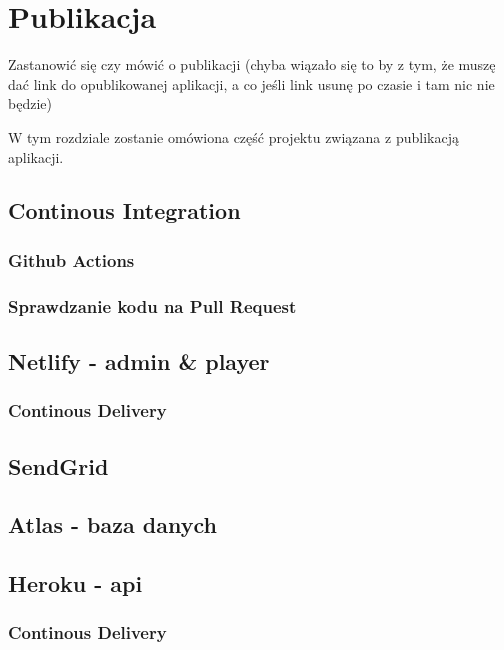 \chapter{Publikacja}
\label{ch:funplenop}

Zastanowić się czy mówić o publikacji (chyba wiązało się to by z tym, że muszę dać link do opublikowanej aplikacji, a co jeśli link usunę po czasie i tam nic nie będzie)

W tym rozdziale zostanie omówiona część projektu związana z publikacją aplikacji.

\section{Continous Integration}
\subsection{Github Actions}
\subsection{Sprawdzanie kodu na Pull Request}

\section{Netlify - admin \& player}
\subsection{Continous Delivery}

\section{SendGrid}

\section{Atlas - baza danych}

\section{Heroku - api}
\subsection{Continous Delivery}